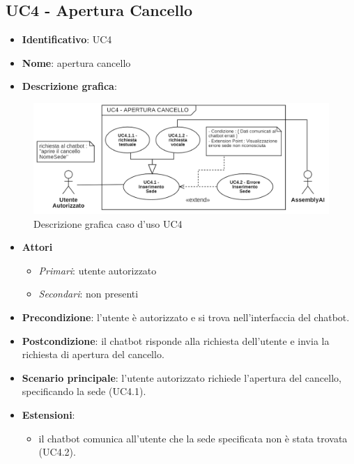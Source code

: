 \subsection{UC4 - Apertura Cancello}
\begin{itemize}
    \item \textbf{Identificativo}: UC4
    \item \textbf{Nome}: apertura cancello
    \item \textbf{Descrizione grafica}:
\end{itemize}

\begin{figure}[h]
   \centering
   \includegraphics[scale=0.6]{images/UC4.png} 
   \caption{Descrizione grafica caso d'uso UC4}
\end{figure}


 \begin{itemize}
    \item \textbf{Attori}
 \begin{itemize} 
    \item \textit{Primari}: utente autorizzato
    \item \textit{Secondari}: non presenti
 \end{itemize}
 \item \textbf{Precondizione}: l'utente è autorizzato e si trova nell'interfaccia del chatbot.
 \item \textbf{Postcondizione}: il chatbot risponde alla richiesta dell'utente e invia la richiesta di apertura del cancello.
 \item \textbf{Scenario principale}: l'utente autorizzato richiede l'apertura del cancello, specificando la sede (UC4.1).
 \item \textbf{Estensioni}: 
 \begin{itemize} 
    \item il chatbot comunica all'utente che la sede specificata non è stata trovata (UC4.2).
 \end{itemize}
\end{itemize}
\newpage

